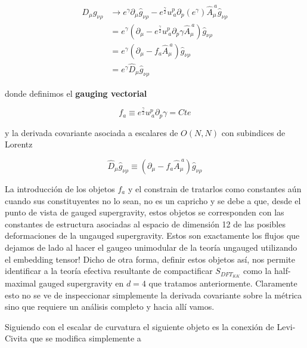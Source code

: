 \documentclass{article}
\numberwithin{equation}{section}
\begin{document}
\begin{equation}
\begin{aligned}
D_{\mu}g_{\nu \rho} &\longrightarrow e^{\gamma} \partial_{\mu}\hat{g}_{\nu \rho} - e^{\frac{\gamma}{2}} u^{p}_{\ a} \partial_p (e^{\gamma}) \hat{A}_{\mu}^{\ a} \hat{g}_{\nu \rho}\\
&= e^{\gamma} \left( \partial_{\mu} - e^{\frac{\gamma}{2}} u^{p}_{\ a} \partial_p \gamma \hat{A}_{\mu}^{\ a} \right) \hat{g}_{\nu \rho}\\
&= e^{\gamma} \left( \partial_{\mu} - f_a \hat{A}_{\mu}^{\ a} \right) \hat{g}_{\nu \rho}\\
&= e^{\gamma} \hat{D}_{\mu}\hat{g}_{\nu \rho}
\end{aligned}
\end{equation}

donde definimos el \textbf{gauging vectorial}

\begin{equation}\label{fa}
f_a \equiv e^{\frac{\gamma}{2}} u^{p}_{\ a} \partial_p \gamma= Cte
\end{equation}

y la derivada covariante asociada a escalares de $ O(N,N) $ con subindices de Lorentz 

\begin{equation}\label{Dhatg}
\hat{D}_{\mu}\hat{g}_{\nu \rho} \equiv \left( \partial_{\mu} - f_a \hat{A}_{\mu}^{\ a} \right) \hat{g}_{\nu \rho}
\end{equation}

La introducción de los objetos $ f_a $ y el constrain de tratarlos como constantes aún cuando sus constituyentes no lo sean, no es un capricho y se debe a que, desde el punto de vista de gauged supergravity, estos objetos se corresponden con las constantes de estructura asociadas al espacio de dimensión 12 de las posibles deformaciones de la ungauged supergravity. Estos son exactamente los flujos que dejamos de lado al hacer el gaugeo unimodular de la teoría ungauged utilizando el embedding tensor!
Dicho de otra forma, definir estos objetos así, nos permite identificar a la teoría efectiva resultante de compactificar $ S_{DFT_{KK}} $ como la half-maximal gauged supergravity en $ d=4 $ que tratamos anteriormente. Claramente esto no se ve de inspeccionar simplemente la derivada covariante sobre la métrica sino que requiere un análisis completo y hacia allí vamos.

Siguiendo con el escalar de curvatura el siguiente objeto es la conexión de Levi-Civita que se modifica simplemente a 
\end{document}
